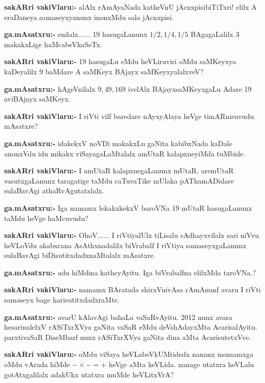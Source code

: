 \smallskip
\noindent
\textbf{sakARri vakiVlaru:-} alAlx rAmAyaNada katheVnU jAcnxpisibiTiTxri! elilx A eraDaneya samaseyxyanunx inonxMdu sala jAcnxpisi.

\smallskip
\noindent
\textbf{ga.mAsatxru:-} enilalx$\ldots\ldots$ {\rm 19} hasugaLanunx $1/2, 1/4, 1/5$ BAgagaLalilx {\rm 3} makakxLige haMcabeVkaSeTx.

\smallskip
\noindent
\textbf{sakARri vakiVlaru:-} {\rm 19} hasugaLu eMdu heVLiruviri oMdu saMKeyxya kaDeyalilx {\rm 9} baMdare A saMKeyx BAjayx saMKeyxyalalxveV?

\smallskip
\noindent
\textbf{ga.mAsatxru:-} hAgeVnilalx $9, 49, 169$ ivelAlx BAjayxsaMKeyxgaLu Adare {\rm 19} aviBAjayx saMKeyx.

\smallskip
\noindent
\textbf{sakARri vakiVlaru:-} I riVti vilf baredare nAyxyAlaya heVge timARnisuvudu mAsatxre?

\smallskip
\noindent
\textbf{ga.mAsatxru:-} idakekxV noVDi makakxLu gaNita kabibxNada kaDale anonxVdu idu mikakx viSayagaLaMtalalx amUtaR kalapxneyiMda tuMbide.

\smallskip
\noindent
\textbf{sakARri vakiVlaru:-} I amUtaR kalapxnegaLanunx mUtaR, aremUtaR vasutxgaLanunx taragatige taMdu caTuvaTike mUlaka pAThamADidare sulaBavAgi athaRvAgutatxlalx.

\smallskip
\noindent
\textbf{ga.mAsatxru:-} Iga namamx lekakxkekxV baroVNa {\rm 19} mUtaR hasugaLanunx taMdu heVge haMcuvudu?

\smallskip
\noindent
\textbf{sakARri vakiVlaru:-} OhoV$\ldots\ldots$ I riVtiyalUlx tiLisalu sAdhayxvilalx sari niVvu heVLoVdu akabxrana AsAthxnadalilx biVrabalf I riVtiya samaseyxgaLanunx sulaBavAgi biDisutitxdadxnaMtalalx mAsatxre.

\smallskip
\noindent
\textbf{ga.mAsatxru:-} adu hiMdina katheyAyitu. Iga biVrabalfna elilxMda taroVNa.?

\smallskip
\noindent
\textbf{sakARri vakiVlaru:-} namamx BAratada shirxVnivAsa rAmAnunf avaru I riVti samaseyx bage harisutitxdadxraMte.

\smallskip
\noindent
\textbf{ga.mAsatxru:-} avarU kAlavAgi bahaLa vaSaRvAyitu. {\rm 2012} nunx avara hesarinalelxV rASiTxrXVya gaNita vaSaR eMdu deVshAdayxMta AcarisalAyitu. parxtivaSaR DiseMbarf nunx rASiTxrXVya gaNita dina aMta AcarisutetxVve.

\smallskip
\noindent
\textbf{sakARri vakiVlaru:-} oMdu viSaya heVLabeVkUMtidedx nananx momamxga oMdu vArada hiMde $-\times -=+$ heVge aMta keVLida. nanage utatxra heVLalu gotAtxgalilalx adakUkx utatxra muMde heVLitxVrA?

